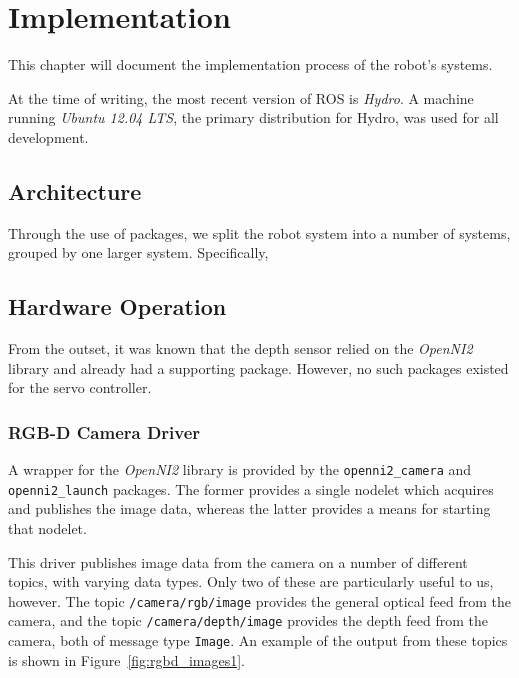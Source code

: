\chapter{Implementation}


This chapter will document the implementation process of the robot's systems.

At the time of writing, the most recent version of ROS is \emph{Hydro}. A machine running \emph{Ubuntu 12.04 LTS}, the primary distribution for Hydro, was used for all development.


\section{Architecture}

Through the use of packages, we split the robot system into a number of systems, grouped by one larger system. Specifically, 


\section{Hardware Operation}

From the outset, it was known that the depth sensor relied on the \emph{OpenNI2} library and already had a supporting package. However, no such packages existed for the servo controller.

\subsection{RGB-D Camera Driver}

A wrapper for the \emph{OpenNI2} library is provided by the \texttt{openni2\_camera} \cite{ros_wiki_openni2_camera} and \texttt{openni2\_launch} \cite{ros_wiki_openni2_launch} packages. The former provides a single nodelet which acquires and publishes the image data, whereas the latter provides a means for starting that nodelet.

This driver publishes image data from the camera on a number of different topics, with varying data types. Only two of these are particularly useful to us, however. The topic \texttt{/camera/rgb/image} provides the general optical feed from the camera, and the topic \texttt{/camera/depth/image} provides the depth feed from the camera, both of message type \texttt{Image}. An example of the output from these topics is shown in Figure~\ref{fig:rgbd_images1}. 

